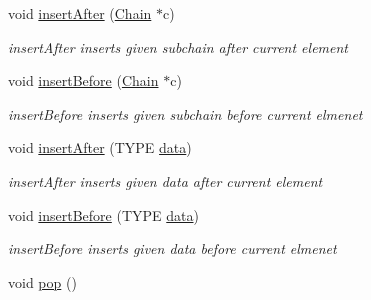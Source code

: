 \begin{DoxyCompactItemize}
void \hyperlink{classChain_a8e044eca9ddb093211203a61c4aeb139}{insert\+After} (\hyperlink{classChain}{Chain} $\ast$c)
\begin{DoxyCompactList}\small\item\em insert\+After inserts given subchain after current element \end{DoxyCompactList}\item 
void \hyperlink{classChain_a47099e0a5193503c92458ffbb5ecb277}{insert\+Before} (\hyperlink{classChain}{Chain} $\ast$c)
\begin{DoxyCompactList}\small\item\em insert\+Before inserts given subchain before current elmenet \end{DoxyCompactList}\item 
void \hyperlink{classChain_adfec3f6f34ee095ffdb953418417ed63}{insert\+After} (T\+Y\+P\+E \hyperlink{classChain_aeb9b72f09201d5553bb04e25593dc7fa}{data})
\begin{DoxyCompactList}\small\item\em insert\+After inserts given data after current element \end{DoxyCompactList}\item 
void \hyperlink{classChain_a93b7323dd2f294dcfe07d6c67ec4619a}{insert\+Before} (T\+Y\+P\+E \hyperlink{classChain_aeb9b72f09201d5553bb04e25593dc7fa}{data})
\begin{DoxyCompactList}\small\item\em insert\+Before inserts given data before current elmenet \end{DoxyCompactList}\item 
\hypertarget{classChain_ad9ff2a0f87c43c3aa711c3ac5e3dc37a}{}void \hyperlink{classChain_ad9ff2a0f87c43c3aa711c3ac5e3dc37a}{pop} ()\label{classChain_ad9ff2a0f87c43c3aa711c3ac5e3dc37a}


\end{DoxyCompactItemize}
